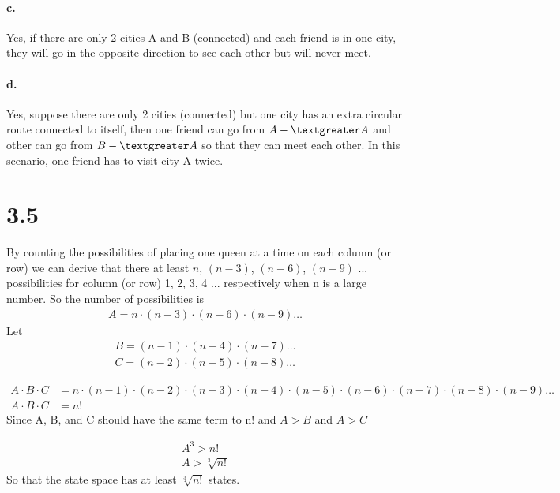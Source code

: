 \documentclass[a4paper]{article}
\begin{document}
\paragraph{c.} Yes, if there are only 2 cities A and B (connected) and each friend is in one city, they will go in the opposite direction to see each other but will never meet.

\vspace{1 cm}

\paragraph{d.} Yes, suppose there are only 2 cities (connected) but one city has an extra circular route connected to itself, then one friend can go from $A -\textgreater A$ and other can go from $B -\textgreater A$ so that they can meet each other. In this scenario, one friend has to visit city A twice. 

\vspace{1 cm}

\section*{3.5}

\indent By counting the possibilities of placing one queen at a time on each column (or row) we can derive that there at least $n$, $(n-3)$, $(n-6)$, $(n-9)$ ... possibilities for column (or row) 1, 2, 3, 4 ... respectively when n is a large number. So the number of possibilities is
\begin{align*}
A = n \cdot (n-3) \cdot (n-6) \cdot (n-9) \ldots
\end{align*}
Let
\begin{align*}
B = (n-1) \cdot (n-4) \cdot (n-7) \ldots \\
C = (n-2) \cdot (n-5) \cdot (n-8) \ldots
\end{align*}

\begin{align*}
A \cdot B \cdot C &= n \cdot (n-1) \cdot (n-2) \cdot (n-3) \cdot (n-4) \cdot (n-5) \cdot (n-6) \cdot (n-7) \cdot (n-8) \cdot (n-9) \ldots \\
A \cdot B \cdot C &= n!
\end{align*}
Since A, B, and C should have the same term to n! and $A > B$ and $A > C$

\begin{align*}
A^{3} > n! \\
A > \sqrt[3]{n!}
\end{align*}
So that the state space has at least $\sqrt[3]{n!}$ states.
\end{document}
